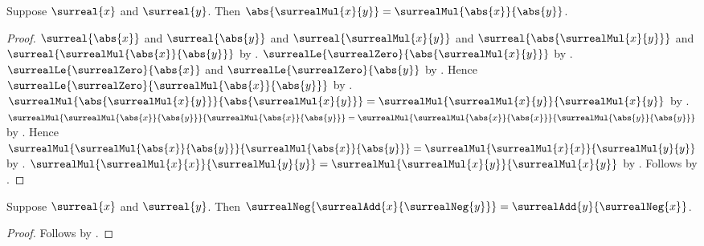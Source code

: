 \begin{theorem}\label{surreal_abs_multiplicative}
    Suppose $\surreal{x}$ and $\surreal{y}$.
    Then
        $\abs{\surrealMul{x}{y}}
            =\surrealMul{\abs{x}}{\abs{y}}$.
\end{theorem}
\begin{proof}
    $\surreal{\abs{x}}$ and $\surreal{\abs{y}}$ and
        $\surreal{\surrealMul{x}{y}}$ and
        $\surreal{\abs{\surrealMul{x}{y}}}$ and
        $\surreal{\surrealMul{\abs{x}}{\abs{y}}}$
        by
        .
    $\surrealLe{\surrealZero}{\abs{\surrealMul{x}{y}}}$
        by .
    $\surrealLe{\surrealZero}{\abs{x}}$ and
        $\surrealLe{\surrealZero}{\abs{y}}$
        by .
    Hence
        $\surrealLe{\surrealZero}
            {\surrealMul{\abs{x}}{\abs{y}}}$
        by .
    $\surrealMul{\abs{\surrealMul{x}{y}}}
            {\abs{\surrealMul{x}{y}}}
        =\surrealMul{\surrealMul{x}{y}}{\surrealMul{x}{y}}$
        by .
    $\surrealMul{
            \surrealMul{\abs{x}}{\abs{y}}}
            {\surrealMul{\abs{x}}{\abs{y}}}
        =\surrealMul{
            \surrealMul{\abs{x}}{\abs{x}}}
            {\surrealMul{\abs{y}}{\abs{y}}}$
        by .
    Hence
        $\surrealMul{
            \surrealMul{\abs{x}}{\abs{y}}}
            {\surrealMul{\abs{x}}{\abs{y}}}
        =\surrealMul{\surrealMul{x}{x}}{\surrealMul{y}{y}}$
        by .
    $\surrealMul{\surrealMul{x}{x}}{\surrealMul{y}{y}}
        =\surrealMul{\surrealMul{x}{y}}{\surrealMul{x}{y}}$
        by .
    Follows by .
\end{proof}

\begin{proposition}\label{surreal_difference_negation}
    Suppose $\surreal{x}$ and $\surreal{y}$.
    Then
        $\surrealNeg{\surrealAdd{x}{\surrealNeg{y}}}
            =\surrealAdd{y}{\surrealNeg{x}}$.
\end{proposition}
\begin{proof}
    Follows by
        .
\end{proof}

